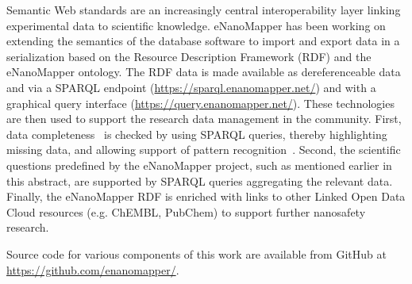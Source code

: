 \documentclass{llncs}
\begin{document}
Semantic Web standards are an increasingly central interoperability layer 
linking experimental data to scientific knowledge. eNanoMapper has been working 
on extending the semantics of the database software to import and export data in 
a serialization based on the Resource Description Framework (RDF) and the 
eNanoMapper ontology. The RDF data is made available as dereferenceable data and 
via a SPARQL endpoint (\url{https://sparql.enanomapper.net/}) and with a
graphical query interface (\url{https://query.enanomapper.net/}). These technologies 
are then used to support the research data management in the community. 
First, data completeness~\cite{MarcheseRobinson2016} is checked by using SPARQL queries, thereby highlighting 
missing data, and allowing support of pattern recognition~\cite{Willighagen2011}.
Second, the scientific questions predefined by the eNanoMapper project, 
such as mentioned earlier in this abstract, are supported by SPARQL queries 
aggregating the relevant data. Finally, the eNanoMapper RDF is enriched with links 
to other Linked Open Data Cloud resources (e.g. ChEMBL, PubChem) to support further 
nanosafety research.

Source code for various components of this work are available from GitHub at
\url{https://github.com/enanomapper/}.



\end{document}
